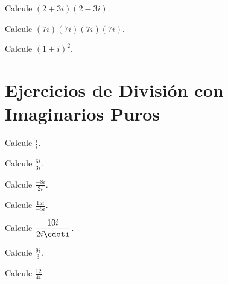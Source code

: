 \begin{ejercicio}
Calcule $\displaystyle (2+3i)(2-3i)$.
\end{ejercicio}

\begin{ejercicio}
Calcule $\displaystyle (7i)(7i)(7i)(7i)$.
\end{ejercicio}

\begin{ejercicio}
Calcule $\displaystyle (1+i)^2$.
\end{ejercicio}




\section*{Ejercicios de División con Imaginarios Puros}

\begin{ejercicio}
Calcule $\displaystyle \frac{i}{i}$.
\end{ejercicio}

\begin{ejercicio}
Calcule $\displaystyle \frac{6i}{3i}$.
\end{ejercicio}

\begin{ejercicio}
Calcule $\displaystyle \frac{-8i}{2i}$.
\end{ejercicio}

\begin{ejercicio}
Calcule $\displaystyle \frac{15i}{-5i}$.
\end{ejercicio}

\begin{ejercicio}
Calcule $\displaystyle \frac{10i}{2i\cdoti}$.
\end{ejercicio}

\begin{ejercicio}
Calcule $\displaystyle \frac{9i}{3}$.
\end{ejercicio}

\begin{ejercicio}
Calcule $\displaystyle \frac{12}{4i}$.
\end{ejercicio}


